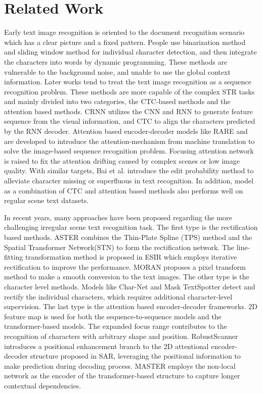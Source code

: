 \documentclass[runningheads]{llncs}
\begin{document}
\section{Related Work}
Early text image recognition is oriented to the document recognition scenario which has a clear picture and a fixed pattern. People use binarization method\cite{casey1996survey} and sliding window method\cite{wang2011end} for individual character detection, and then integrate the characters into words by dynamic programming. These methods are vulnerable to the background noise, and unable to use the global context information. Later works tend to treat the text image recognition as a sequence recognition problem. These methods are more capable of the complex STR tasks and mainly divided into two categories, the CTC-based methods and the attention based methods. CRNN\cite{shi2016end} utilizes the CNN and RNN to generate feature sequence from the visual information, and CTC to align the characters predicted by the RNN decoder. Attention based encoder-decoder models like RARE\cite{shi2016robust} and \cite{lee2016recursive} are developed to introduce the attention-mechanism from machine translation\cite{bahdanau2014neural} to solve the image-based sequence recognition problem. Focusing attention network\cite{cheng2017focusing} is raised to fix the attention drifting caused by complex scenes or low image quality. With similar targets, Bai et al. introduce the edit probability\cite{bai2018edit} method to alleviate character missing or superfluous in text recognition. In addition, model as a combination of CTC and attention based methods\cite{zuo2019natural} also performs well on regular scene text datasets.

In recent years, many approaches have been proposed regarding the more challenging irregular scene text recognition task. The first type is the rectification based methods. ASTER\cite{shi2018aster} combines the Thin-Plate Spline (TPS) method\cite{bookstein1993thin} and the Spatial Transformer Network(STN)\cite{jaderberg2015spatial} to form the rectification network. The line-fitting transformation method is proposed in ESIR\cite{zhan2019esir} which employs iterative rectification to improve the performance. MORAN\cite{luo2019moran} proposes a pixel transform method to make a smooth conversion to the text images. The other type is the character level methods. Models like Char-Net\cite{liu2018char} and Mask TextSpotter\cite{liao2019mask} detect and rectify the individual characters, which requires additional character-level supervision. The last type is the attention based encoder-decoder frameworks. 2D feature map is used for both the sequence-to-sequence models\cite{li2019show,yue2020robustscanner} and the transformer-based models\cite{yang2020holistic,lu2019master}. The expanded focus range contributes to the recognition of characters with arbitrary shape and position. RobustScanner\cite{yue2020robustscanner} introduces a positional enhancement branch to the 2D attentional encoder-decoder structure proposed in SAR\cite{li2019show}, leveraging the positional information to make prediction during decoding process. MASTER\cite{lu2019master} employs the non-local network as the encoder of the transformer-based structure to capture longer contextual dependencies.
\end{document}
